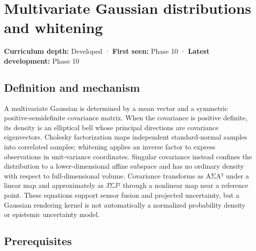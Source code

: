 \hypertarget{appendix-12bbe185dbe5}{}\label{referencestart:appendix-12bbe185dbe5}
\section{Multivariate Gaussian distributions and whitening}\label{appendix-12bbe185dbe5-multivariate-gaussian-distributions-and-whitening}

\hypertarget{appendix-12bbe185dbe5-multivariate-gaussian-distributions-and-whitening}{}

\textbf{Curriculum depth:} Developed · \textbf{First seen:} Phase 10 · \textbf{Latest development:} Phase 10

\begin{allmightroledefinition}

\subsection{Definition and mechanism}\label{appendix-12bbe185dbe5-definition-and-mechanism}

\hypertarget{appendix-12bbe185dbe5-definition-and-mechanism}{}

A multivariate Gaussian is determined by a mean vector and a symmetric positive-semidefinite covariance matrix. When the covariance is positive definite, its density is an elliptical bell whose principal directions are covariance eigenvectors. Cholesky factorization maps independent standard-normal samples into correlated samples; whitening applies an inverse factor to express observations in unit-variance coordinates. Singular covariance instead confines the distribution to a lower-dimensional affine subspace and has no ordinary density with respect to full-dimensional volume. Covariance transforms as AΣAᵀ under a linear map and approximately as JΣJᵀ through a nonlinear map near a reference point. These equations support sensor fusion and projected uncertainty, but a Gaussian rendering kernel is not automatically a normalized probability density or epistemic uncertainty model.

\end{allmightroledefinition}

\subsection{Prerequisites}\label{appendix-12bbe185dbe5-prerequisites}

\hypertarget{appendix-12bbe185dbe5-prerequisites}{}

